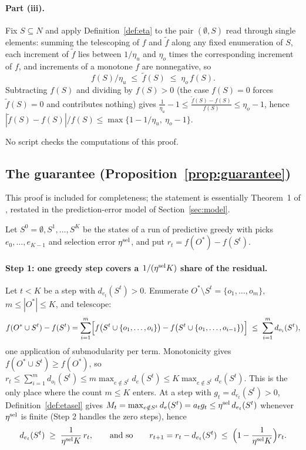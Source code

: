 \paragraph{Part (iii).}
Fix $S\subseteq N$ and apply Definition~\ref{def:eta} to the pair
$(\emptyset,S)$ read through single elements: summing the telescoping of
$f$ and $\tilde f$ along any fixed enumeration of $S$, each increment of
$\tilde f$ lies between $1/\eta_u$ and $\eta_o$ times the corresponding
increment of $f$, and increments of a monotone $f$ are nonnegative, so
\[
  f(S)/\eta_u\;\le\;\tilde f(S)\;\le\;\eta_o\,f(S).
\]
Subtracting $f(S)$ and dividing by $f(S)>0$ (the case $f(S)=0$ forces
$\tilde f(S)=0$ and contributes nothing) gives
$\tfrac1{\eta_u}-1\le\tfrac{\tilde f(S)-f(S)}{f(S)}\le\eta_o-1$, hence
$|\tilde f(S)-f(S)|/f(S)\le\max\{1-1/\eta_u,\ \eta_o-1\}$.

No script checks the computations of this proof.

\subsection{The guarantee (Proposition~\ref{prop:guarantee})}\label{app:guarantee}
This proof is included for completeness; the statement is essentially
Theorem~1 of \citet{goundan2007revisiting}, restated in the prediction-error
model of Section~\ref{sec:model}.

Let $S^{0}=\emptyset,S^{1},\dots,S^{K}$ be the states of a run of predictive
greedy with picks $e_{0},\dots,e_{K-1}$ and selection error $\eta^{\mathrm{sel}}$, and put
$r_t=f(O^{\ast})-f(S^{t})$.

\paragraph{Step 1: one greedy step covers a $1/(\eta^{\mathrm{sel}} K)$ share of the
residual.}
Let $t<K$ be a step with $d_{e_t}(S^{t})>0$.  Enumerate
$O^{\ast}\setminus S^{t}=\{o_1,\dots,o_m\}$, $m\le|O^{\ast}|\le K$, and
telescope:
\[
  f(O^{\ast}\cup S^{t})-f(S^{t})
  =\sum_{i=1}^{m}\Bigl[f\bigl(S^{t}\cup\{o_1,\dots,o_i\}\bigr)
   -f\bigl(S^{t}\cup\{o_1,\dots,o_{i-1}\}\bigr)\Bigr]
  \;\le\;\sum_{i=1}^{m}d_{o_i}(S^{t}),
\]
one application of submodularity per term.  Monotonicity gives
$f(O^{\ast}\cup S^{t})\ge f(O^{\ast})$, so
$r_t\le\sum_{i=1}^{m}d_{o_i}(S^{t})\le m\max_{e\notin S^{t}}d_e(S^{t})
\le K\max_{e\notin S^{t}}d_e(S^{t})$.  This is the only place where the count
$m\le K$ enters.  At a step with $g_t=d_{e_t}(S^{t})>0$,
Definition~\ref{def:etasel} gives
$M_t=\max_{e\notin S^{t}}d_e(S^{t})=a_tg_t\le\eta^{\mathrm{sel}}\,d_{e_t}(S^{t})$
whenever $\eta^{\mathrm{sel}}$ is finite (Step 2 handles the zero steps), hence
\[
  d_{e_t}(S^{t})\;\ge\;\frac{1}{\eta^{\mathrm{sel}} K}\,r_t,
  \qquad\text{and so}\qquad
  r_{t+1}=r_t-d_{e_t}(S^{t})\;\le\;\Bigl(1-\frac{1}{\eta^{\mathrm{sel}} K}\Bigr)r_t .
\]

